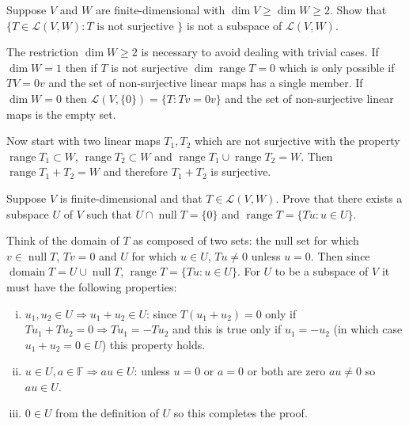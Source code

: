 \documentclass[11pt,a4paper]{scrartcl}
\DeclareMathOperator{\range}{range}
\DeclareMathOperator{\domain}{domain}
\DeclareMathOperator{\nspace}{null}
\newcommand{\lmap}[2]{\mathcal{L}(#1,#2)}
\newcommand{\FF}{\mathbb{F}}
\newcounter{problem}
\begin{document}
\begin{problem}[3.B.8]
    {
        Suppose $V$ and $W$ are finite-dimensional with $\dim V \geq \dim W \geq 2$.
        Show that $\{T \in \lmap{V}{W}: T \text{ is not surjective }\}$
        is not a subspace of $\lmap{V}{W}$.
    }
    {
        The restriction $\dim W \geq 2$ is necessary to avoid dealing with trivial cases.
        If $\dim W=1$ then if $T$ is not surjective $\dim \range T=0$ which is only possible
        if $TV=0v$ and the set of non-surjective linear maps has a single member. 
        If $\dim W=0$ then $\lmap{V}{\{0\}}=\{T:Tv=0v\}$ and the set of non-surjective linear
        maps is the empty set.        

        Now start with two linear maps $T_1, T_2$ which are not surjective with the property
        $\range T_1 \subset W$, $\range T_2 \subset W$ and $\range T_1 \cup \range T_2 = W$.
        Then $\range T_1+T_2 = W$ and therefore $T_1+T_2$ is surjective. 
    }
\end{problem}

\begin{problem}[3.B.12]
    {
        Suppose $V$ is finite-dimensional and that $T \in \lmap{V}{W}$. Prove that there
        exists a subspace $U$ of $V$ such that $U \cap \nspace T =\{0\}$ and 
        $\range T=\{ Tu: u \in U\}$.
    }
    {
        Think of the domain of $T$ as composed of two sets: the null set for which
        $v \in \nspace T$, $Tv=0$ and $U$ for which $u \in U$, $Tu\neq 0$ unless $u=0$.  
        Then since $\domain T= U \cup \nspace T$, $\range T= \{Tu: u \in U\}$. For $U$ to
        be a subspace of $V$ it must have the following properties:
        \begin{enumerate}[i),itemsep=0pt,parsep=0pt]
            \item $u_1,u_2\in U \Rightarrow u_1+u_2 \in U$: since $T(u_1+u_2)=0$
            only if $Tu_1+Tu_2=0\Rightarrow Tu_1=-Tu_2$ and this is true only
            if $u_1=-u_2$ (in which case $u_1+u_2=0\in U$) this property holds.
            \item $u \in U, a \in \FF \Rightarrow au \in U$: unless $u=0$ or $a=0$
            or both are zero $au\neq 0$ so $au \in U$.
            \item $0 \in U$ from the definition of $U$ so this completes the proof.
        \end{enumerate}
        \ 
    }
\end{problem}
\end{document}
